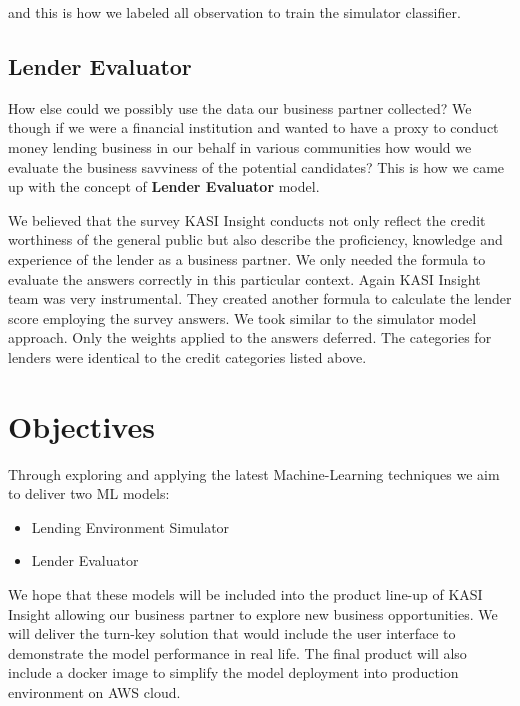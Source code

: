 and this is how we labeled all observation to train the simulator
classifier.

\hypertarget{lender-evaluator}{%
\subsection{Lender Evaluator}\label{lender-evaluator}}

How else could we possibly use the data our business partner collected?
We though if we were a financial institution and wanted to have a proxy
to conduct money lending business in our behalf in various communities
how would we evaluate the business savviness of the potential
candidates? This is how we came up with the concept of \textbf{Lender
Evaluator} model.

We believed that the survey KASI Insight conducts not only reflect the
credit worthiness of the general public but also describe the
proficiency, knowledge and experience of the lender as a business
partner. We only needed the formula to evaluate the answers correctly in
this particular context. Again KASI Insight team was very instrumental.
They created another formula to calculate the lender score employing the
survey answers. We took similar to the simulator model approach. Only
the weights applied to the answers deferred. The categories for lenders
were identical to the credit categories listed above.

\hypertarget{objectives}{%
\section{Objectives}\label{objectives}}

Through exploring and applying the latest Machine-Learning techniques we
aim to deliver two ML models:

\begin{itemize}
\item
  Lending Environment Simulator
\item
  Lender Evaluator
\end{itemize}

We hope that these models will be included into the product line-up of
KASI Insight allowing our business partner to explore new business
opportunities. We will deliver the turn-key solution that would include
the user interface to demonstrate the model performance in real life.
The final product will also include a docker image to simplify the model
deployment into production environment on AWS cloud.

